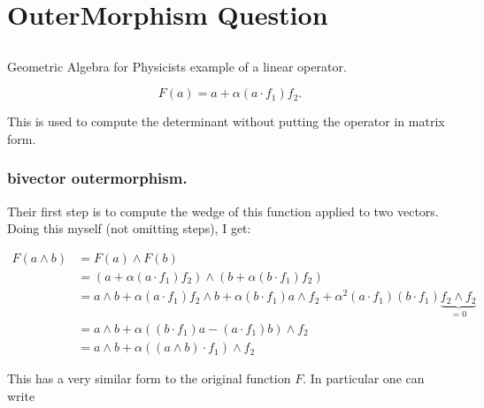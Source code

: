 
%
\chapter{OuterMorphism Question }
\date{ Sept. 2, 2008.  Last Revision: $Date: 2009/06/11 16:54:24 $ }

%


\section{}

Geometric Algebra for Physicists example of a linear operator.

\begin{equation}\label{eqn:outermorphism_det:F}
F(a) = a + \alpha(a \cdot f_1) f_2. 
\end{equation} 

This is used to compute the determinant without putting the operator 
in matrix form.

\subsection{bivector outermorphism. }

Their first step is to compute the wedge of this function applied to two vectors.  Doing this myself (not omitting steps), I get:

\begin{align*} 
F(a \wedge b) 
&= F(a) \wedge F(b) \\
&= (a + \alpha(a \cdot f_1) f_2 ) \wedge (b + \alpha(b \cdot f_1) f_2 ) \\
&= a \wedge b + \alpha(a \cdot f_1) f_2 \wedge b
+ \alpha (b \cdot f_1) a \wedge f_2 
+ \alpha^2 (a \cdot f_1) (b \cdot f_1) \underbrace{f_2 \wedge f_2}_{=0} \\
&= a \wedge b 
+ \alpha \left( (b \cdot f_1) a - (a \cdot f_1) b \right) \wedge f_2  
\\
&= a \wedge b 
+ \alpha \left( (a \wedge b ) \cdot f_1 \right) \wedge f_2  
\end{align*} 

This has a very similar form to the original function $F$.  In particular 
one can write 


